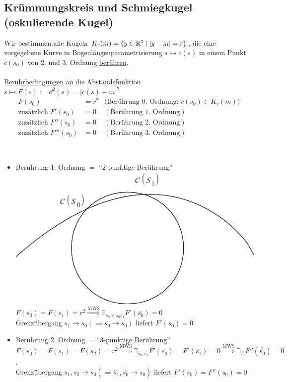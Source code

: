 \subsection{Krümmungskreis und Schmiegkugel (oskulierende Kugel)}
Wir bestimmen alle Kugeln \(K_r(m) = \{ y \in \mathbb{R}^3 \mid |y-m| = r \}\), die eine vorgegebene Kurve in Bogenlängenparametrisierung \(s \mapsto c(s)\) in einem Punkt \(c(s_0)\) von 2. und 3. Ordnung \uline{berühren}. \\\\
\uline{Berührbedingungen} an die Abstandsfunktion \(s \mapsto F(s) := \dd^2 (s) = |c(s) - m|^2\)
\begin{align*}
 F(s_0) &= r^2 &\big(\text{Berührung 0. Ordnung: }c(s_0) \in K_r(m)\big) \\
 \text{zusätzlich } F'(s_0) &= 0 &(\text{Berührung 1. Ordnung}) \\
 \text{zusätzlich } F''(s_0) &= 0 &(\text{Berührung 2. Ordnung}) \\
 \text{zusätzlich } F'''(s_0) &= 0 &(\text{Berührung 3. Ordnung})
\end{align*}

\begin{begruendung} \(\)
\begin{itemize}
 \item Berührung 1. Ordnung \(=\) "`2-punktige Berührung"' \includegraphics[scale=0.2]{Bilder/Bsp5.jpg} \\
 \(F(s_0) = F(s_1) = r^2 \stackrel{\text{MWS}}{\Rightarrow} \exists_{\overline {s_0} \in \overline{s_0 s_1}} F'(\overline{s_0}) = 0 \) \\
 Grenzübergang \(s_1 \to s_0 (\Rightarrow \overline {s_0} \to s_0)\) liefert \(F'(s_0) = 0\)
 \item Berührung 2. Ordnung \(=\)"`3-punktige Berührung"' \\
 \(F(s_0) = F(s_1) = F(s_2) = r^2 \stackrel{\text{MWS}}{\Rightarrow} \exists_{\overline{s_0}, \overline{s_1}} F'(\overline{s_0}) = F'(\overline{s_1}) = 0 \stackrel{\text{MWS}}{\Rightarrow} \exists_{\overline{\overline{s_0}}} F''(\overline{\overline{s_0}}) = 0\).\\
 Grenzübergang \(s_1, s_2 \to s_0 (\Rightarrow \overline{s_1}, \overline{\overline{s_0}} \to s_0)\) liefert \(F'(s_0) = F''(s_0) = 0\)
\end{itemize}
\end{begruendung}

